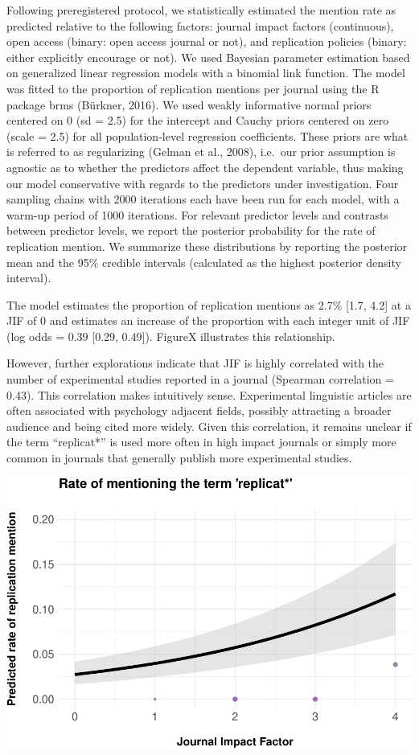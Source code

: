 \documentclass[]{elsarticle} %
\begin{document}
Following preregistered protocol, we statistically estimated the mention
rate as predicted relative to the following factors: journal impact
factors (continuous), open access (binary: open access journal or not),
and replication policies (binary: either explicitly encourage or not).
We used Bayesian parameter estimation based on generalized linear
regression models with a binomial link function. The model was fitted to
the proportion of replication mentions per journal using the R package
brms (Bürkner, 2016). We used weakly informative normal priors centered
on 0 (sd = 2.5) for the intercept and Cauchy priors centered on zero
(scale = 2.5) for all population-level regression coefficients. These
priors are what is referred to as regularizing (Gelman et al., 2008),
i.e.~our prior assumption is agnostic as to whether the predictors
affect the dependent variable, thus making our model conservative with
regards to the predictors under investigation. Four sampling chains with
2000 iterations each have been run for each model, with a warm-up period
of 1000 iterations. For relevant predictor levels and contrasts between
predictor levels, we report the posterior probability for the rate of
replication mention. We summarize these distributions by reporting the
posterior mean and the 95\% credible intervals (calculated as the
highest posterior density interval).

The model estimates the proportion of replication mentions as 2.7\%
{[}1.7, 4.2{]} at a JIF of 0 and estimates an increase of the proportion
with each integer unit of JIF (log odds = 0.39 {[}0.29, 0.49{]}).
FigureX illustrates this relationship.

However, further explorations indicate that JIF is highly correlated
with the number of experimental studies reported in a journal (Spearman
correlation = 0.43). This correlation makes intuitively sense.
Experimental linguistic articles are often associated with psychology
adjacent fields, possibly attracting a broader audience and being cited
more widely. Given this correlation, it remains unclear if the term
``replicat*'' is used more often in high impact journals or simply more
common in journals that generally publish more experimental studies.

\begin{center}\includegraphics[width=1\linewidth]{ReplicationLing_files/figure-latex/plot_mention_jif-1} \end{center}
\end{document}
